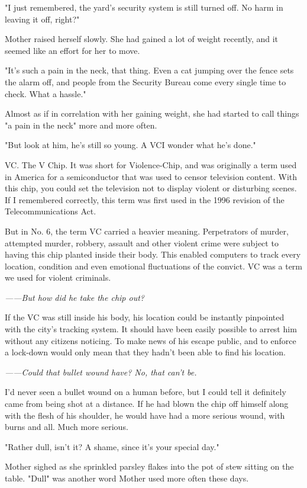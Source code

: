 "I just remembered, the yard's security system is still turned off. No
harm in leaving it off, right?"

Mother raised herself slowly. She had gained a lot of weight recently,
and it seemed like an effort for her to move.

"It's such a pain in the neck, that thing. Even a cat jumping over the
fence sets the alarm off, and people from the Security Bureau come every
single time to check. What a hassle."

Almost as if in correlation with her gaining weight, she had started to
call things "a pain in the neck" more and more often.

"But look at him, he's still so young. A VC\el I wonder what he's done."

VC. The V Chip. It was short for Violence-Chip, and was originally a
term used in America for a semiconductor that was used to censor
television content. With this chip, you could set the television not to
display violent or disturbing scenes. If I remembered correctly, this
term was first used in the 1996 revision of the Telecommunications Act.

But in No. 6, the term VC carried a heavier meaning. Perpetrators of
murder, attempted murder, robbery, assault and other violent crime were
subject to having this chip planted inside their body. This enabled
computers to track every location, condition and even emotional
fluctuations of the convict. VC was a term we used for violent
criminals.

\emph{------But how did he take the chip out?}

If the VC was still inside his body, his location could be instantly
pinpointed with the city's tracking system. It should have been easily
possible to arrest him without any citizens noticing. To make news of
his escape public, and to enforce a lock-down would only mean that they
hadn't been able to find his location.

\emph{------Could that bullet wound have\el ? No, that can't be.}

I'd never seen a bullet wound on a human before, but I could tell it
definitely came from being shot at a distance. If he had blown the chip
off himself along with the flesh of his shoulder, he would have had a
more serious wound, with burns and all. Much more serious.

"Rather dull, isn't it? A shame, since it's your special day."

Mother sighed as she sprinkled parsley flakes into the pot of stew
sitting on the table. "Dull" was another word Mother used more often
these days.

